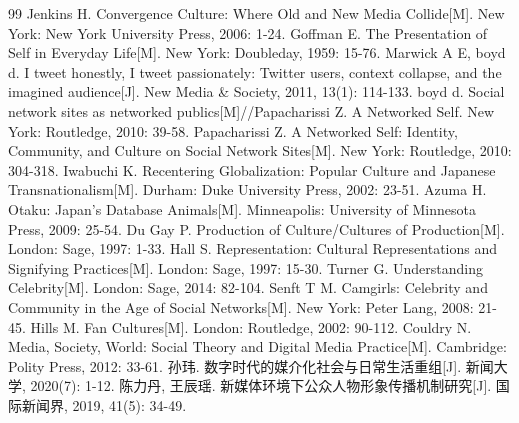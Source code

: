 \begin{thebibliography}{99}
 Jenkins H. Convergence Culture: Where Old and New Media Collide[M]. New York: New York University Press, 2006: 1-24.
 Goffman E. The Presentation of Self in Everyday Life[M]. New York: Doubleday, 1959: 15-76.
 Marwick A E, boyd d. I tweet honestly, I tweet passionately: Twitter users, context collapse, and the imagined audience[J]. New Media \& Society, 2011, 13(1): 114-133.
 boyd d. Social network sites as networked publics[M]//Papacharissi Z. A Networked Self. New York: Routledge, 2010: 39-58.
 Papacharissi Z. A Networked Self: Identity, Community, and Culture on Social Network Sites[M]. New York: Routledge, 2010: 304-318.
 Iwabuchi K. Recentering Globalization: Popular Culture and Japanese Transnationalism[M]. Durham: Duke University Press, 2002: 23-51.
 Azuma H. Otaku: Japan's Database Animals[M]. Minneapolis: University of Minnesota Press, 2009: 25-54.
 Du Gay P. Production of Culture/Cultures of Production[M]. London: Sage, 1997: 1-33.
 Hall S. Representation: Cultural Representations and Signifying Practices[M]. London: Sage, 1997: 15-30.
 Turner G. Understanding Celebrity[M]. London: Sage, 2014: 82-104.
 Senft T M. Camgirls: Celebrity and Community in the Age of Social Networks[M]. New York: Peter Lang, 2008: 21-45.
 Hills M. Fan Cultures[M]. London: Routledge, 2002: 90-112.
 Couldry N. Media, Society, World: Social Theory and Digital Media Practice[M]. Cambridge: Polity Press, 2012: 33-61.
 孙玮. 数字时代的媒介化社会与日常生活重组[J]. 新闻大学, 2020(7): 1-12.
 陈力丹, 王辰瑶. 新媒体环境下公众人物形象传播机制研究[J]. 国际新闻界, 2019, 41(5): 34-49.
\end{thebibliography}

